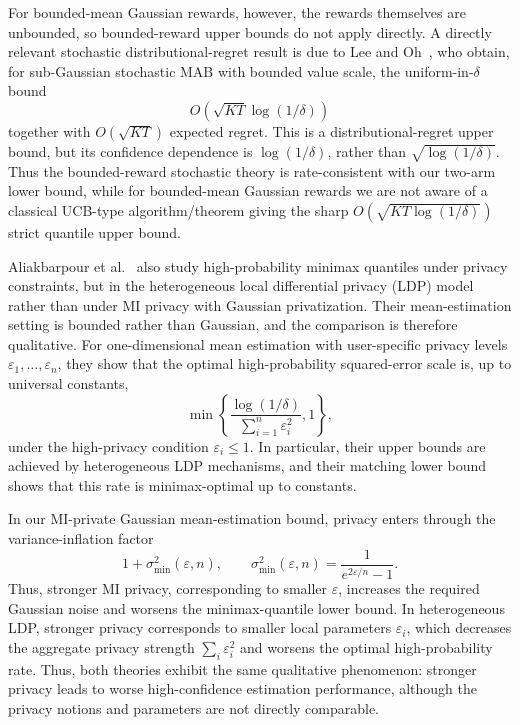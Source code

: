 \documentclass[journal]{IEEEtran}
\begin{document}
For bounded-mean Gaussian rewards, however, the rewards themselves are
unbounded, so bounded-reward upper bounds do not apply directly. A directly
relevant stochastic distributional-regret result is due to Lee and
Oh~\cite{lee2026unified}, who obtain, for sub-Gaussian stochastic MAB with
bounded value scale, the uniform-in-\(\delta\) bound
\[
O\!\left(\sqrt{KT}\log(1/\delta)\right)
\]
together with \(O(\sqrt{KT})\) expected regret. This is a 
distributional-regret upper bound, but its confidence dependence is
\(\log(1/\delta)\), rather than \(\sqrt{\log(1/\delta)}\). Thus the
bounded-reward stochastic theory is rate-consistent with our two-arm lower
bound, while for bounded-mean Gaussian rewards we are not aware of a classical
UCB-type algorithm/theorem giving the sharp
\(O(\sqrt{KT\log(1/\delta)})\) strict quantile upper bound.

Aliakbarpour et al.~\cite{aliakbarpour2025high} also study high-probability
minimax quantiles under privacy constraints, but in the heterogeneous local
differential privacy (LDP) model rather than under MI privacy with Gaussian
privatization. Their mean-estimation setting is bounded rather than Gaussian, and the comparison is therefore qualitative. For one-dimensional
mean estimation with user-specific privacy levels
\(\varepsilon_1,\dots,\varepsilon_n\), they show that the optimal
high-probability squared-error scale is, up to universal constants,
\[
\min\!\left\{
\frac{\log(1/\delta)}{\sum_{i=1}^n \varepsilon_i^2},
1
\right\},
\]
under the high-privacy condition \(\varepsilon_i\le 1\). In particular, their
upper bounds are achieved by heterogeneous LDP mechanisms, and their matching
lower bound shows that this rate is minimax-optimal up to constants.

In our MI-private Gaussian mean-estimation bound, privacy enters through the
variance-inflation factor
\[
1+\sigma_{\min}^2(\varepsilon,n),
\qquad
\sigma_{\min}^2(\varepsilon,n)
=
\frac{1}{e^{2\varepsilon/n}-1}.
\]
Thus, stronger MI privacy, corresponding to smaller \(\varepsilon\), increases
the required Gaussian noise and worsens the minimax-quantile lower bound. In
heterogeneous LDP, stronger privacy corresponds to smaller local parameters
\(\varepsilon_i\), which decreases the aggregate privacy strength
\(\sum_i \varepsilon_i^2\) and worsens the optimal high-probability rate. Thus,
both theories exhibit the same qualitative phenomenon: stronger privacy leads
to worse high-confidence estimation performance, although the privacy notions
and parameters are not directly comparable.
\end{document}
